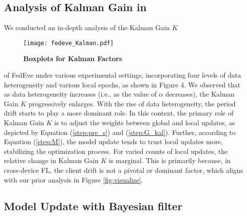 \subsection{Analysis of Kalman Gain in \fedeve} 
We conducted an in-depth analysis of the Kalman Gain $K$ 
\begin{figure}
  \centering
  \label{fig:kalman_gain}
  \texttt{[image: fedeve\_Kalman.pdf]}
  \caption{\small\textbf{Boxplots for Kalman Factors}}
\end{figure}
 of FedEve under various experimental settings, incorporating four levels of data heterogeneity and various local epochs, as shown in Figure 4. We observed that as data heterogeneity increases (i.e., as the value of $\alpha$ decreases), the Kalman Gain $K$ progressively enlarges. With the rise of data heterogeneity, the period drift starts to play a more dominant role. In this context, the primary role of Kalman Gain $K$ is to adjust the weights between global and local updates, as depicted by Equation (\ref{step:pre_s}) and (\ref{step:G_kal}). Further, according to Equation (\ref{step:M}), the model update tends to trust local updates more, stabilizing the optimization process. For varied counts of local updates, the relative change in Kalman Gain $K$ is marginal. This is primarily because, in cross-device FL, the client drift is not a pivotal or dominant factor, which aligns with our prior analysis in Figure \ref{fig:visualize}.


\subsection{Model Update with Bayesian filter}\label{appdx:bayesian}
